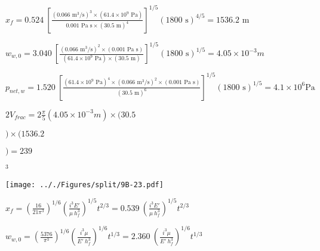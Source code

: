 \documentclass[onecolumn,11pt]{report}
\def\lthtmlcheckvsize{\ifdim\ht\sizebox<\vsize 
  \ifdim\wd\sizebox<\hsize\expandafter\hfill\fi \expandafter\vfill
  \else\expandafter\vss\fi}%
\begin{document}
{\newpage\clearpage
{}%
$\displaystyle x_f = 0.524 \:
\left[ \frac{(0.066 \text{ m}^3/\text{s})^3 \times (61.4\times 10^9 \text{ Pa})}{0.001 \text{ Pa s} \times (30.5 \text{ m})^4} \right]^{1/5} (1800 \text{ s})^{4/5}
= 1536.2 \text{ m}$%
\lthtmlindisplaymathZ
\lthtmlcheckvsize\clearpage}

{\newpage\clearpage
{}%
$\displaystyle w_{w,0} = 3.040 \:
\left[ \frac{(0.066 \text{ m}^3/\text{s})^2 \times (0.001 \text{ Pa s})}{(61.4\times 10^9 \text{ Pa}) \times  (30.5 \text{ m})} \right]^{1/5} 						(1800 \text{ s})^{1/5}
= 4.05 \times 10^{-3} m$%
\lthtmlindisplaymathZ
\lthtmlcheckvsize\clearpage}

{\newpage\clearpage
{}%
$\displaystyle p_{net,w} = 1.520 \:
\left[ \frac{(61.4\times 10^9 \text{ Pa})^4 \times (0.066 \text{ m}^3/\text{s})^2 \times (0.001 \text{ Pa s})}{(30.5 \text{ m})^6} \right]^{1/5} (1800 \text{ s})^{1/5}
= 4.1 \times 10^{6} \text{Pa}$%
\lthtmlindisplaymathZ
\lthtmlcheckvsize\clearpage}

{\newpage\clearpage
{}%
$\displaystyle 2 V_{frac} = 2 \frac{\pi}{5} (4.05 \times 10^{-3} m) \times
(30.5$%
\lthtmlindisplaymathZ
\lthtmlcheckvsize\clearpage}

{\newpage\clearpage
{}%
$\displaystyle ) \times (1536.2$%
\lthtmlindisplaymathZ
\lthtmlcheckvsize\clearpage}

{\newpage\clearpage
{}%
$\displaystyle )
= 239$%
\lthtmlindisplaymathZ
\lthtmlcheckvsize\clearpage}

{\newpage\clearpage
{}%
$\displaystyle ^3$%
\lthtmlindisplaymathZ
\lthtmlcheckvsize\clearpage}

{\newpage\clearpage
{}%
\texttt{[image: .././Figures/split/9B-23.pdf]}%
\lthtmlpictureZ
\lthtmlcheckvsize\clearpage}

{\newpage\clearpage
{}%
$\displaystyle x_f = \left( \frac{16}{21 \pi^3} \right)^{1/6}
\left( \frac{i^3 E'}{\mu \: h_f^3} \right)^{1/5} 						t^{2/3}
= 0.539 \:
\left( \frac{i^3 E'}{\mu \: h_f^3} \right)^{1/5} 						t^{2/3}$%
\lthtmlindisplaymathZ
\lthtmlcheckvsize\clearpage}

{\newpage\clearpage
{}%
$\displaystyle w_{w,0} = \left( \frac{5376}{\pi^3} \right)^{1/6}
\left( \frac{i^3 \mu}{E' \: h_f^3} \right)^{1/6} 						t^{1/3}
= 2.360 \:
\left( \frac{i^3 \mu}{E' \: h_f^3} \right)^{1/6} 						t^{1/3}$%
\lthtmlindisplaymathZ
\lthtmlcheckvsize\clearpage}
\end{document}
